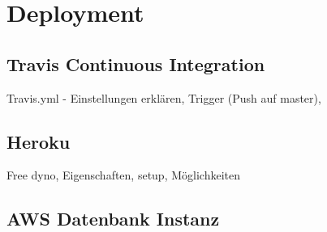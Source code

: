 \section{Deployment}
\subsection{Travis Continuous Integration}
Travis.yml - Einstellungen erklären, Trigger (Push auf master), 

\subsection{Heroku}
Free dyno, Eigenschaften, setup, Möglichkeiten

\subsection{AWS Datenbank Instanz}
